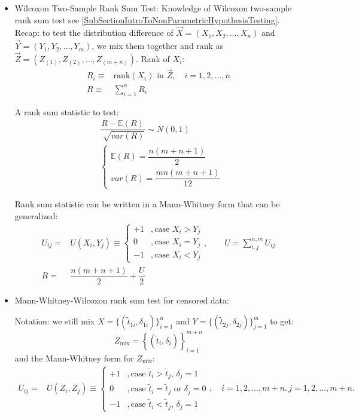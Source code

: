 \begin{itemize}[topsep=2pt,itemsep=0pt]
    \item Wilcoxon Two-Sample Rank Sum Test: Knowledge of Wilcoxon two-sample rank sum test see \autoref{SubSectionIntroToNonParametricHypothesisTesting}. Recap: to test the distribution difference of $ \vec{X}=(X_{1},X_{2},\ldots,X_{n})  $ and $ \vec{Y}=(Y_{1},Y_{2},\ldots,Y_{m})  $, we mix them together  and rank as $ \vec{Z}=(Z_{(1)},Z_{(2)},\ldots,Z_{(m+n)})$. Rank of $ X_i $:
    \begin{align}
        R_{i}\equiv &\mathrm{rank}(X_i)\text{ in } \vec{Z},\quad i=1,2,\ldots,n  \\
        R\equiv &\sum_{i=1}^nR_i
    \end{align}
        
    A rank sum statistic to test:
    \begin{align}
        &\dfrac{R-\mathbb{E}\left( R \right)}{\sqrt[]{var(R)}}\sim N(0,1)\\
        &\begin{cases}
            \mathbb{E}\left( R \right) =\dfrac{n(m+n+1)}{2}\\
            var(R)=\dfrac{mn(m+n+1)}{12}
        \end{cases}
    \end{align}

    Rank sum statistic can be written in a Mann-Whitney form that can be generalized:
    \begin{align}
        U_{ij}=&U(X_i,Y_j)\equiv\begin{cases}
            +1&,\text{case } X_i>Y_j\\
            0&,\text{case } X_i=Y_j\\
            -1&,\text{case }X_i<Y_j
        \end{cases},\qquad U=\sum_{i,j}^{n,m}U_{ij}\\
        R=&\dfrac{n(m+n+1)}{2}+\dfrac{U}{2}
    \end{align}

\item Mann-Whitney-Wilcoxon rank sum test for censored data: 

    Notation: we still mix $ X=\{(\tilde{t}_{1i},\delta _{1i})\}_{i=1}^n $ and $ Y=\{(\tilde{t}_{2j},\delta _{2j})\}_{j=1}^m $ to get:
    \begin{equation}
        Z_\mathrm{mix}=\left\{ (\tilde{t}_i,\delta _i) \right\}_{i=1}^{m+n}  
    \end{equation}
    and the Mann-Whitney form for $ Z_\mathrm{mix}  $:
    \begin{align}
        U_{ij}=&U(Z_i,Z_j)  \equiv\begin{cases}
            +1&,\text{case } \tilde{t}_i>\tilde{t}_j,\, \delta _j=1\\
            0&,\text{case }  \tilde{t}_i=\tilde{t}_j \text{ or } \delta _j=0\\
            -1&,\text{case } \tilde{t}_i<\tilde{t}_j,\, \delta _j=1
        \end{cases},\quad i=1,2,\ldots ,m+n.\, j=1,2,\ldots ,m+n.
    \end{align}
         

\end{itemize}
